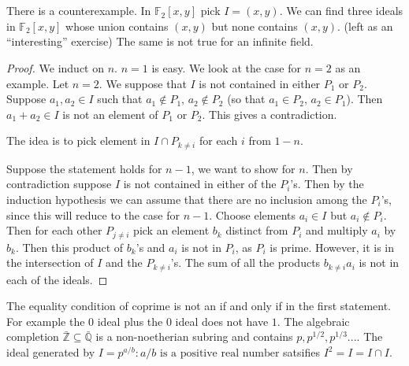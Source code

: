 \section{}

\begin{remark}
    There is a counterexample. In $\mathbb{F}_2[x,y]$ pick $I=(x,y)$. We can find three ideals in $\mathbb{F}_2[x,y]$ whose union contains $(x,y)$ but none contains $(x,y)$. (left as an ``interesting'' exercise)
    The same is not true for an infinite field.
\end{remark}
\begin{proof}
    We induct on $n$. $n=1$ is easy. We look at the case for $n=2$ as an example.
    Let $n=2$.
    We suppose that $I$ is not contained in either $P_1$ or $P_2$.
    Suppose $a_1,a_2\in I$ such that $a_1\notin P_1$, $a_2\notin P_2$ (so that $a_1\in P_2$, $a_2\in P_1$). Then $a_1+a_2\in I$ is not an element of $P_1$ or $P_2$. This gives a contradiction.

    The idea is to pick element in $I\cap P_{k\neq i}$ for each $i$ from $1-n$.

    Suppose the statement holds for $n-1$, we want to show for $n$. Then by contradiction suppose $I$ is not contained in either of the $P_i$'s. Then by the induction hypothesis we can assume that there are no inclusion among the $P_i$'s, since this will reduce to the case for $n-1$.
    Choose elements $a_i \in I$ but $a_i\notin P_i$. Then for each other $P_{j\neq i}$ pick an element $b_k$ distinct from $P_i$ and multiply $a_i$ by $b_k$. Then this product of $b_k$'s and $a_i$ is not in $P_i$, as $P_i$ is prime. However, it is in the intersection of $I$ and the $P_{k\neq i}$'s. The sum of all the products $b_{k\neq i} a_i$ is not in each of the ideals.  
\end{proof}
\begin{remark}
    The equality condition of coprime is not an if and only if in the first statement. For example the $0$ ideal plus the $0$ ideal does not have $1$. 
    The algebraic completion $\bar{\mathbb{Z}}\subseteq \bar{\mathbb{Q}}$ is a non-noetherian subring and contains $p,p^{1/2},p^{1/3}...$. The ideal generated by $I={p^{a/b}: a/b \textrm{ is a positive real number}}$ satsifies $I^2=I=I\cap I$.
\end{remark}
